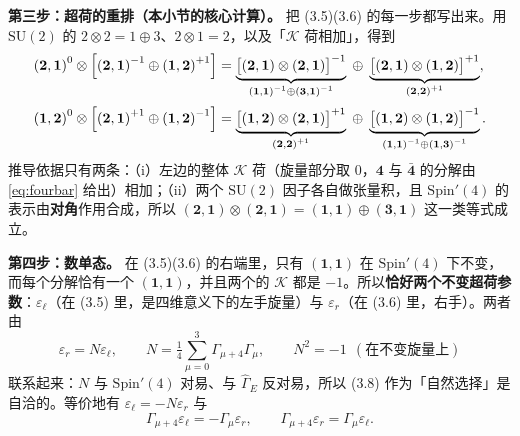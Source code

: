 \textbf{第三步：超荷的重排（本小节的核心计算）。} 把 (3.5)(3.6) 的每一步都写出来。用 $\mathrm{SU}(2)$ 的 $2\otimes2=1\oplus3$、$2\otimes1=2$，以及「$\mathcal K$ 荷相加」，得到\pA{}
\begin{align}
\mathbf{(2,1)}^{0}\otimes\Bigl[\mathbf{(2,1)}^{-1}\oplus\mathbf{(1,2)}^{+1}\Bigr]
&=\underbrace{\bigl[\mathbf{(2,1)}\otimes\mathbf{(2,1)}\bigr]^{-1}}_{\mathbf{(1,1)}^{-1}\oplus\mathbf{(3,1)}^{-1}}
\;\oplus\;
\underbrace{\bigl[\mathbf{(2,1)}\otimes\mathbf{(1,2)}\bigr]^{+1}}_{\mathbf{(2,2)}^{+1}},
\label{eq:branch5}\\[2pt]
\mathbf{(1,2)}^{0}\otimes\Bigl[\mathbf{(2,1)}^{+1}\oplus\mathbf{(1,2)}^{-1}\Bigr]
&=\underbrace{\bigl[\mathbf{(1,2)}\otimes\mathbf{(2,1)}\bigr]^{+1}}_{\mathbf{(2,2)}^{+1}}
\;\oplus\;
\underbrace{\bigl[\mathbf{(1,2)}\otimes\mathbf{(1,2)}\bigr]^{-1}}_{\mathbf{(1,1)}^{-1}\oplus\mathbf{(1,3)}^{-1}}.
\label{eq:branch6}
\end{align}
推导依据只有两条：（i）左边的整体 $\mathcal K$ 荷（旋量部分取 $0$，$\mathbf 4$ 与 $\bar{\mathbf 4}$ 的分解由 \eqref{eq:fourbar} 给出）相加；（ii）两个 $\mathrm{SU}(2)$ 因子各自做张量积，且 $\mathrm{Spin}'(4)$ 的表示由\textbf{对角}作用合成，所以 $\mathbf{(2,1)}\otimes\mathbf{(2,1)}=(\mathbf{1},\mathbf{1})\oplus(\mathbf{3},\mathbf{1})$ 这一类等式成立\pB。

\textbf{第四步：数单态。} 在 (3.5)(3.6) 的右端里，只有 $\mathbf{(1,1)}$ 在 $\mathrm{Spin}'(4)$ 下不变，而每个分解恰有一个 $\mathbf{(1,1)}$，并且两个的 $\mathcal K$ 都是 $-1$。所以\textbf{恰好两个不变超荷参数}：$\varepsilon_\ell$（在 (3.5) 里，是四维意义下的左手旋量）与 $\varepsilon_r$（在 (3.6) 里，右手）\pA{}。两者由
\begin{equation}
\varepsilon_r=N\varepsilon_\ell,\qquad
N=\tfrac14\sum_{\mu=0}^{3}\Gamma_{\mu+4}\Gamma_\mu,\qquad
N^2=-1\ \ (\text{在不变旋量上})
\label{eq:N}
\end{equation}
联系起来：$N$ 与 $\mathrm{Spin}'(4)$ 对易、与 $\hat\Gamma_E$ 反对易，所以 (3.8) 作为「自然选择」是自洽的\pA{}。等价地有 $\varepsilon_\ell=-N\varepsilon_r$ 与
\begin{equation}
\Gamma_{\mu+4}\varepsilon_\ell=-\Gamma_\mu\varepsilon_r,
\qquad
\Gamma_{\mu+4}\varepsilon_r=\Gamma_\mu\varepsilon_\ell .
\label{eq:gammarels}
\end{equation}

